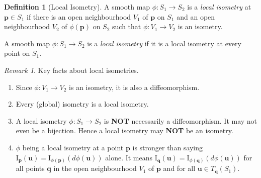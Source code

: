 \documentclass[10pt, a4paper]{article}
\theoremstyle{plain}
\theoremstyle{definition}
\newtheorem{definition}[theorem]{Definition}
\theoremstyle{remark}
\newtheorem{remark}[theorem]{Remark}
\begin{document}
\begin{definition}[Local Isometry]
  A smooth map $\phi: S_1 \to S_2$ is a \emph{local isometry} at $\mathbf{p} \in S_1$ if
  there is an open neighbourhood $V_1$ of $\mathbf{p}$ on $S_1$ and an open neighbourhood
  $V_2$ of $\phi(\mathbf{p})$ on $S_2$ such that $\phi: V_1 \to V_2$ is an isometry.

  A smooth map $\phi: S_1 \to S_2$ is a \emph{local isometry} if it is a local isometry at
  every point on $S_1$.
\end{definition}

\begin{remark}
Key facts about local isometries.
\begin{enumerate}
  \item Since $\phi: V_1 \to V_2$ is an isometry, it is also a diffeomorphism.
  \item Every (global) isometry is a local isometry.
  \item A local isometry $\phi: S_1 \to S_2$ is \textbf{NOT} necessarily a diffeomorphism.
  It may not even be a bijection. Hence a local isometry may \textbf{NOT} be an isometry.
  \item $\phi$ being a local isometry at a point $\mathbf{p}$ is stronger than saying
  $\mathrm{I}_{\mathbf{p}}(\mathbf{u}) = \mathrm{I}_{\phi(\mathbf{p})}(d\phi(\mathbf{u}))$ alone.
  It means $\mathrm{I}_{\mathbf{q}}(\mathbf{u}) = \mathrm{I}_{\phi(\mathbf{q})}(d\phi(\mathbf{u}))$
  for all points $\mathbf{q}$ in the open neighbourhood $V_1$ of $\mathbf{p}$ and for all
  $\mathbf{u} \in T_{\mathbf{q}}(S_1)$.
\end{enumerate}
\end{remark}
\end{document}
